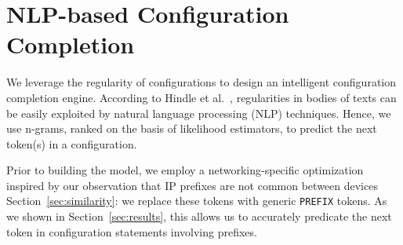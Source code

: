 \section{NLP-based Configuration Completion}

We leverage the regularity of configurations to design an intelligent
configuration completion engine.
According to Hindle et al.~\cite{naturalness}, regularities in bodies of texts
can be easily exploited by natural language processing (NLP) techniques.
Hence, we use n-grams, ranked on the basis of likelihood estimators, to predict
the next token(s) in a configuration.

Prior to building the model, we employ a networking-specific optimization
inspired by our observation that IP prefixes are not common between devices
Section~\ref{sec:similarity}: we replace these tokens with generic {\tt PREFIX}
tokens. As we shown in Section~\ref{sec:results}, this allows us to accurately
predicate the next token in configuration statements involving prefixes.


